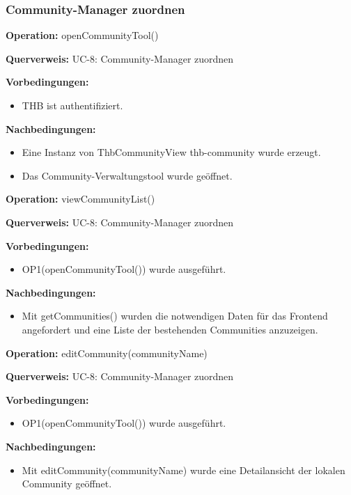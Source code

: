 \documentclass[a4paper,12pt]{article}
\begin{document}
	\subsubsection{Community-Manager zuordnen }
	\begin{contractbox}
		\textbf{Operation:} openCommunityTool()
		
			\textbf{Querverweis:} UC-8: Community-Manager zuordnen
		
		\textbf{Vorbedingungen:}
		\begin{itemize}[noitemsep]
			\item THB ist authentifiziert.
		\end{itemize}
		
		\textbf{Nachbedingungen:}
		\begin{itemize}[noitemsep]
			\item Eine Instanz von ThbCommunityView thb-community wurde erzeugt.
			\item Das Community-Verwaltungstool wurde geöffnet.
		\end{itemize}
	\end{contractbox}

	\begin{contractbox}
		\textbf{Operation:} viewCommunityList()
		
			\textbf{Querverweis:} UC-8: Community-Manager zuordnen
		
		\textbf{Vorbedingungen:}
		\begin{itemize}[noitemsep]
			\item OP1(openCommunityTool()) wurde ausgeführt.
		\end{itemize}
		
		\textbf{Nachbedingungen:}
		\begin{itemize}[noitemsep]
			\item Mit getCommunities() wurden die notwendigen Daten für das Frontend angefordert und eine Liste der bestehenden Communities anzuzeigen.
		\end{itemize}
	\end{contractbox}

	\begin{contractbox}
		\textbf{Operation:} editCommunity(communityName)
		
			\textbf{Querverweis:} UC-8: Community-Manager zuordnen
		
		\textbf{Vorbedingungen:}
		\begin{itemize}[noitemsep]
			\item OP1(openCommunityTool()) wurde ausgeführt.
		\end{itemize}
		
		\textbf{Nachbedingungen:}
		\begin{itemize}[noitemsep]
			\item Mit editCommunity(communityName) wurde eine Detailansicht der lokalen Community geöffnet.
		\end{itemize}
	\end{contractbox}
\end{document}
